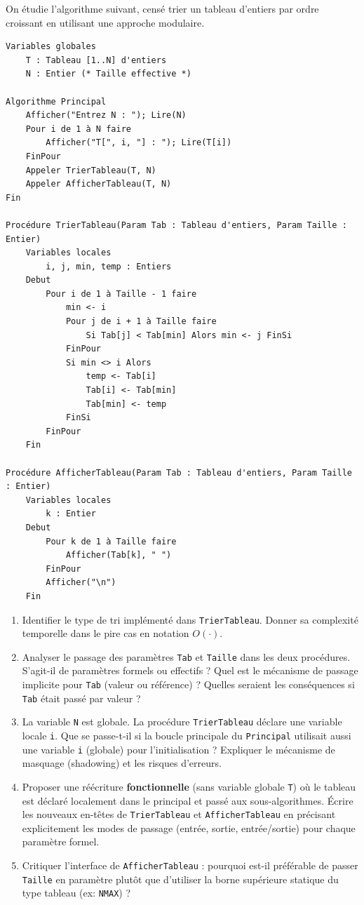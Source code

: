 \documentclass[11pt]{article}
\begin{document}
\begin{exercice}
On étudie l'algorithme suivant, censé trier un tableau d'entiers par ordre croissant en utilisant une approche modulaire.

\begin{verbatim}
Variables globales
    T : Tableau [1..N] d'entiers
    N : Entier (* Taille effective *)

Algorithme Principal
    Afficher("Entrez N : "); Lire(N)
    Pour i de 1 à N faire
        Afficher("T[", i, "] : "); Lire(T[i])
    FinPour
    Appeler TrierTableau(T, N)
    Appeler AfficherTableau(T, N)
Fin

Procédure TrierTableau(Param Tab : Tableau d'entiers, Param Taille : Entier)
    Variables locales
        i, j, min, temp : Entiers
    Debut
        Pour i de 1 à Taille - 1 faire
            min <- i
            Pour j de i + 1 à Taille faire
                Si Tab[j] < Tab[min] Alors min <- j FinSi
            FinPour
            Si min <> i Alors
                temp <- Tab[i]
                Tab[i] <- Tab[min]
                Tab[min] <- temp
            FinSi
        FinPour
    Fin

Procédure AfficherTableau(Param Tab : Tableau d'entiers, Param Taille : Entier)
    Variables locales
        k : Entier
    Debut
        Pour k de 1 à Taille faire
            Afficher(Tab[k], " ")
        FinPour
        Afficher("\n")
    Fin
\end{verbatim}

\begin{enumerate}
    \item Identifier le type de tri implémenté dans \texttt{TrierTableau}. Donner sa complexité temporelle dans le pire cas en notation $O(\cdot)$.
    \item Analyser le passage des paramètres \texttt{Tab} et \texttt{Taille} dans les deux procédures. S'agit-il de paramètres formels ou effectifs ? Quel est le mécanisme de passage implicite pour \texttt{Tab} (valeur ou référence) ? Quelles seraient les conséquences si \texttt{Tab} était passé par valeur ?
    \item La variable \texttt{N} est globale. La procédure \texttt{TrierTableau} déclare une variable locale \texttt{i}. Que se passe-t-il si la boucle principale du \texttt{Principal} utilisait aussi une variable \texttt{i} (globale) pour l'initialisation ? Expliquer le mécanisme de masquage (shadowing) et les risques d'erreurs.
    \item Proposer une réécriture \textbf{fonctionnelle} (sans variable globale \texttt{T}) où le tableau est déclaré localement dans le principal et passé aux sous-algorithmes. Écrire les nouveaux en-têtes de \texttt{TrierTableau} et \texttt{AfficherTableau} en précisant explicitement les modes de passage (entrée, sortie, entrée/sortie) pour chaque paramètre formel.
    \item Critiquer l'interface de \texttt{AfficherTableau} : pourquoi est-il préférable de passer \texttt{Taille} en paramètre plutôt que d'utiliser la borne supérieure statique du type tableau (ex: \texttt{NMAX}) ?
\end{enumerate}
\end{exercice}
\end{document}
